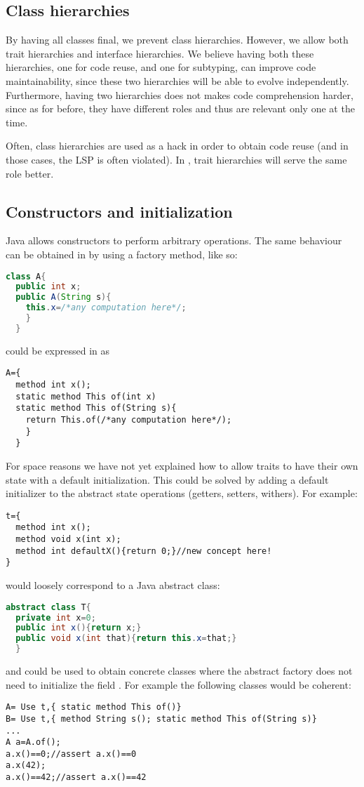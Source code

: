 \subsection{Class hierarchies}
By having all classes final, we prevent class hierarchies.
However,
we allow both trait hierarchies and interface hierarchies.
We believe having both these hierarchies,
one for code reuse, and one for subtyping, can improve code
maintainability, since these two hierarchies will be able to evolve independently. Furthermore, having two hierarchies does not makes code comprehension harder, since as for before, they have different roles and thus are relevant only one at the time.

Often, class hierarchies are used as a hack in order to obtain code reuse (and in those cases, the LSP is often violated).
In \name, trait hierarchies will serve the same role better.


\subsection{Constructors and initialization}
Java allows constructors to perform arbitrary operations.
The same behaviour can be obtained in \name by using a factory method, like so:
\begin{lstlisting}[language=Java]
class A{
  public int x;
  public A(String s){
    this.x=/*any computation here*/;
    }
  }
\end{lstlisting}
could be expressed in \name as 
\begin{lstlisting}
A={
  method int x();
  static method This of(int x)
  static method This of(String s){
    return This.of(/*any computation here*/);
    }
  }
\end{lstlisting}

For space reasons we have not yet explained how to allow traits to have their own state with a default initialization.
This could be solved by adding a default initializer to the abstract state operations (getters, setters, withers).
For example:
\begin{lstlisting}
t={
  method int x();
  method void x(int x);
  method int defaultX(){return 0;}//new concept here!
}
\end{lstlisting}
would loosely correspond to a Java abstract class:
\begin{lstlisting}[language=Java]
abstract class T{
  private int x=0;
  public int x(){return x;}
  public void x(int that){return this.x=that;}
  }
\end{lstlisting}
and could be used to obtain concrete classes where the abstract factory does not need to initialize the field \Q@x@.
For example the following classes would be coherent:
\begin{lstlisting}
A= Use t,{ static method This of()}
B= Use t,{ method String s(); static method This of(String s)}
...
A a=A.of();
a.x()==0;//assert a.x()==0
a.x(42);
a.x()==42;//assert a.x()==42

\end{lstlisting}

